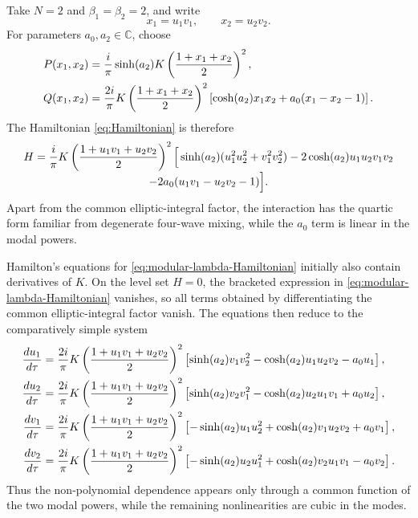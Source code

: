 \documentclass[11pt,a4paper]{article}
\numberwithin{equation}{section}
\begin{document}
Take $N=2$ and $\beta_1=\beta_2=2$, and write
\begin{equation}
    x_1=u_1v_1,
    \qquad
    x_2=u_2v_2.
\end{equation}
For parameters $a_0,a_2\in\mathbb{C}$, choose
\begin{align}
    P(x_1,x_2)
    &=\frac{i}{\pi}\sinh(a_2)
    K\left(\frac{1+x_1+x_2}{2}\right)^2,
    \notag\\
    Q(x_1,x_2)
    &=\frac{2i}{\pi}
    K\left(\frac{1+x_1+x_2}{2}\right)^2
    \left[
        \cosh(a_2)x_1x_2
        +a_0(x_1-x_2-1)
    \right].
    \label{eq:modular-lambda-P-Q}
\end{align}
The Hamiltonian \eqref{eq:Hamiltonian} is therefore
\begin{multline}
    H=\frac{i}{\pi}K\left(
        \frac{1+u_1v_1+u_2v_2}{2}
    \right)^2
    \Big[
        \sinh(a_2)(u_1^2u_2^2+v_1^2v_2^2)
        -2\cosh(a_2)u_1u_2v_1v_2
        \\[-0.2\baselineskip]
        -2a_0(u_1v_1-u_2v_2-1)
    \Big].
    \label{eq:modular-lambda-Hamiltonian}
\end{multline}
Apart from the common elliptic-integral factor, the interaction has the quartic form familiar from degenerate four-wave mixing, while the $a_0$ term is linear in the modal powers.

Hamilton's equations for \eqref{eq:modular-lambda-Hamiltonian} initially also contain derivatives of $K$.
On the level set $H=0$, the bracketed expression in \eqref{eq:modular-lambda-Hamiltonian} vanishes, so all terms obtained by differentiating the common elliptic-integral factor vanish.
The equations then reduce to the comparatively simple system
\begin{align}
    \frac{du_1}{d\tau}
    &=\frac{2i}{\pi}
    K\left(\frac{1+u_1v_1+u_2v_2}{2}\right)^2
    \left[
        \sinh(a_2)v_1v_2^2
        -\cosh(a_2)u_1u_2v_2
        -a_0u_1
    \right],
    \notag\\
    \frac{du_2}{d\tau}
    &=\frac{2i}{\pi}
    K\left(\frac{1+u_1v_1+u_2v_2}{2}\right)^2
    \left[
        \sinh(a_2)v_2v_1^2
        -\cosh(a_2)u_2u_1v_1
        +a_0u_2
    \right],
    \notag\\
    \frac{dv_1}{d\tau}
    &=\frac{2i}{\pi}
    K\left(\frac{1+u_1v_1+u_2v_2}{2}\right)^2
    \left[
        -\sinh(a_2)u_1u_2^2
        +\cosh(a_2)v_1u_2v_2
        +a_0v_1
    \right],
    \notag\\
    \frac{dv_2}{d\tau}
    &=\frac{2i}{\pi}
    K\left(\frac{1+u_1v_1+u_2v_2}{2}\right)^2
    \left[
        -\sinh(a_2)u_2u_1^2
        +\cosh(a_2)v_2u_1v_1
        -a_0v_2
    \right].
    \label{eq:modular-lambda-coupled-system}
\end{align}
Thus the non-polynomial dependence appears only through a common function of the two modal powers, while the remaining nonlinearities are cubic in the modes.
\end{document}
